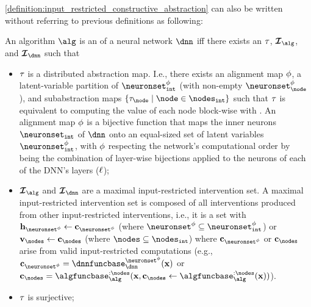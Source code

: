 \cref{definition:input_restricted_constructive_abstraction} can also be written without referring to previous definitions as following:
\begin{altdefinition}
An algorithm $\alg$ is an 
of a neural network $\dnn$ iff there exists an $\tau$, $\interventionsset_{\alg}$, and $\interventionsset_{\dnn}$ such that 
\begin{itemize}
    \item $\tau$ is a distributed abstraction map. I.e., there exists an alignment map $\phi$, a latent-variable partition \smash{$\{\neuronset^{\causalmap}_{\node} \mid \node \in \nodesint\} \cup \{\neuronset^{\causalmap}_{\uselesspartition}\}$} of $\neuronsetintcausal$ (with non-empty $\neuronset^{\causalmap}_{\node}$),
    and subabstraction maps $\{\abstractionmap_{\node} \mid \node \in \nodesint\}$
    such that
    $\tau$ is equivalent to computing the value of each node block-wise with \smash{$\abstractionmap_{\node}(\hiddenstates_{\neuronset^{\causalmap}_{\node}})$}.
    An alignment map $\phi$ is a bijective function that maps the inner neurons $\neuronsetint$ of $\dnn$ onto an equal-sized set of latent variables $\neuronsetintcausal$, with $\phi$ respecting the network’s computational order by being the combination of layer-wise bijections \smash{$\causalmap_{\layer}: \R^{\layerdim{\layer}} \to \R^{\layerdim{\layer}}$} applied to the neurons of each of the DNN's layers ($\ell$);
    \item $\interventionsset_{\alg}$ and $\interventionsset_{\dnn}$ are a maximal input-restricted intervention set. A maximal input-restricted intervention set is composed of all interventions produced from other input-restricted interventions, i.e., it is a set with $\hiddenstates_{\neuronset^\causalmap} \leftarrow \constants_{\neuronset^\causalmap}$  (where $\neuronset^\causalmap\subseteq\neuronsetintcausal$) or $\nodesvalues_{\nodes} \leftarrow \constants_{\nodes}$ (where $\nodes\subseteq\nodesint$) where $\constants_{\neuronset^\causalmap}$ or $\constants_{\nodes}$ arise from valid input-restricted computations (e.g., $\constants_{\neuronset^\causalmap} = \dnnfunclayer{\neuronset^\causalmap}(\bx)$ or $\constants_{\nodes} = \algfuncnode{:\nodes}(\bx, \constants_{\nodes} \leftarrow \algfuncnode{:\nodes}(\bx))$).
    \item $\tau$ is surjective;

\end{itemize}
\end{altdefinition}
